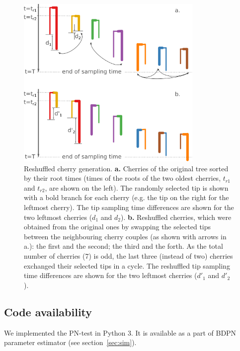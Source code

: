 \documentclass[a4paper,10pt]{article}
\begin{document}
\begin{figure}[tbhp]
\centering 
\includegraphics[width=0.8\textwidth]{Fig_cherryswap.png}
\caption{Reshuffled cherry generation. \textbf{a.} Cherries of the original tree sorted by their root times (times of the roots of the two oldest cherries, $t_{r1}$ and $t_{r2}$, are shown on the left). The randomly selected tip is shown with a bold branch for each cherry (e.g. the tip on the right for the leftmost cherry). The tip sampling time differences are shown for the two leftmost cherries ($d_1$ and $d_2$). \textbf{b.} Reshuffled cherries, which were obtained from the original ones by swapping the selected tips between the neighbouring cherry couples (as shown with arrows in a.): the first and the second; the third and the forth. As the total number of cherries (7) is odd, the last three (instead of two) cherries exchanged their selected tips in a cycle. The reshuffled tip sampling time differences are shown for the two leftmost cherries ($d'_1$ and $d'_2$).}
\label{fig:tipswap} 
\end{figure}



\subsection*{Code availability}
We implemented the PN-test in Python 3. It is available as a part of BDPN parameter estimator (see section~\ref{sec:sim}).
\end{document}
